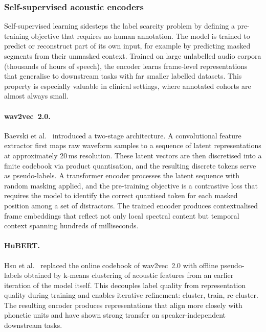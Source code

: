\subsubsection{Self-supervised acoustic encoders}
\label{ssec:acoustic_encoders}

Self-supervised learning sidesteps the label scarcity problem by defining a pre-training objective that requires no human annotation.
The model is trained to predict or reconstruct part of its own input, for example by predicting masked segments from their unmasked context.
Trained on large unlabelled audio corpora (thousands of hours of speech), the encoder learns frame-level representations that generalise to downstream tasks with far smaller labelled datasets.
This property is especially valuable in clinical settings, where annotated cohorts are almost always small.

\paragraph{wav2vec~2.0.}
Baevski et al.~\cite{baevski2020wav2vec} introduced a two-stage architecture.
A convolutional feature extractor first maps raw waveform samples to a sequence of latent representations at approximately 20\,ms resolution.
These latent vectors are then discretised into a finite codebook via product quantisation, and the resulting discrete tokens serve as pseudo-labels.
A transformer encoder processes the latent sequence with random masking applied, and the pre-training objective is a contrastive loss that requires the model to identify the correct quantised token for each masked position among a set of distractors.
The trained encoder produces contextualised frame embeddings that reflect not only local spectral content but temporal context spanning hundreds of milliseconds.

\paragraph{HuBERT.}
Hsu et al.~\cite{hsu2021hubert} replaced the online codebook of wav2vec~2.0 with offline pseudo-labels obtained by k-means clustering of acoustic features from an earlier iteration of the model itself.
This decouples label quality from representation quality during training and enables iterative refinement: cluster, train, re-cluster.
The resulting encoder produces representations that align more closely with phonetic units and have shown strong transfer on speaker-independent downstream tasks.

